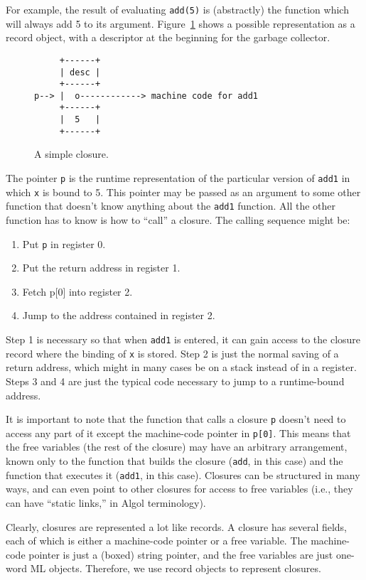 For example, the result of evaluating \verb"add(5)" is (abstractly) the
function which will always add 5 to its argument.  
Figure~\ref{add5} shows a possible representation
as a record object, with a descriptor at  the beginning for the
garbage collector.
\begin{figure}[htbp]
\label{add5}
\begin{verbatim}
     +------+
     | desc |
     +------+
p--> |  o------------> machine code for add1
     +------+
     |  5   |
     +------+
\end{verbatim}
\caption{A simple closure.}
\end{figure}
The pointer \verb"p" is the runtime representation of the particular version
of \verb"add1" in which \verb|x| is bound to 5.  This pointer may be passed
as an argument to some other function that doesn't know anything about
the \verb"add1" function.  All the other function has to know is how
to ``call'' a closure.  The calling sequence might be:
\begin{enumerate}
\item Put \verb|p| in register 0.
\item Put the return address in register 1.
\item Fetch p[0] into register 2.
\item Jump to the address contained in register 2.
\end{enumerate}
Step 1 is necessary so that when \verb"add1" is entered, it can gain
access to the closure record where the binding of \verb"x" is stored.
Step 2 is just the normal saving of a return address, which might
in many cases be on a stack instead of in a register.  Steps 3 and
4 are just the typical code necessary to jump to a runtime-bound address.

It is important to note that the function that calls a closure \verb"p"
doesn't need to access any part of it except the machine-code pointer
in \verb|p[0]|.  This means that the free variables (the rest of the
closure) may have an arbitrary arrangement, known only to the
function that builds the closure (\verb"add", in this case) and the
function that executes it (\verb"add1", in this case).  Closures can
be structured in many ways\cite{appel88:clo}, and can even point
to other closures for access to free variables (i.e., they can
have ``static links,'' in Algol terminology).

Clearly, closures are represented a lot like records.  A closure has several
fields, each of which is either a machine-code pointer or a free variable.
The machine-code pointer is just a (boxed) string pointer,
and the free variables are
just one-word ML objects.  Therefore, we use record
objects to represent closures.

